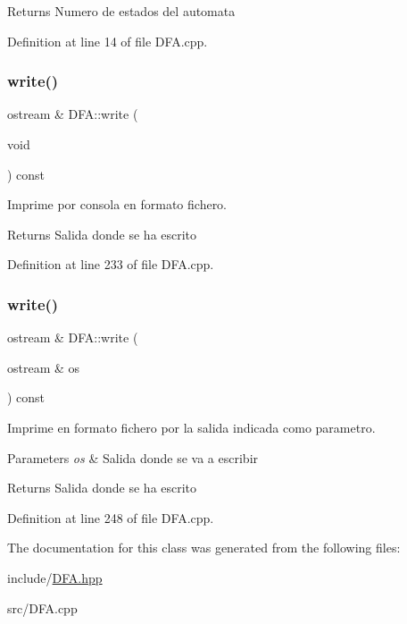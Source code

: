 \begin{DoxyReturn}{Returns}
Numero de estados del automata 
\end{DoxyReturn}


Definition at line 14 of file D\+F\+A.\+cpp.

\mbox{\label{class_d_f_a_a453bbd313adb90e3615694aad833b014}} 
\subsubsection{\texorpdfstring{write()}{write()}\hspace{0.1cm}{\footnotesize\ttfamily [1/2]}}
{\footnotesize\ttfamily ostream \& D\+F\+A\+::write (\begin{DoxyParamCaption}\item[{void}]{ }\end{DoxyParamCaption}) const}



Imprime por consola en formato fichero. 

\begin{DoxyReturn}{Returns}
Salida donde se ha escrito 
\end{DoxyReturn}


Definition at line 233 of file D\+F\+A.\+cpp.

\mbox{\label{class_d_f_a_aec27d0774ad67c7c29a5679e938fab5d}} 
\subsubsection{\texorpdfstring{write()}{write()}\hspace{0.1cm}{\footnotesize\ttfamily [2/2]}}
{\footnotesize\ttfamily ostream \& D\+F\+A\+::write (\begin{DoxyParamCaption}\item[{ostream \&}]{os }\end{DoxyParamCaption}) const}



Imprime en formato fichero por la salida indicada como parametro. 


\begin{DoxyParams}{Parameters}
{\em os} & Salida donde se va a escribir \\
\hline
\end{DoxyParams}
\begin{DoxyReturn}{Returns}
Salida donde se ha escrito 
\end{DoxyReturn}


Definition at line 248 of file D\+F\+A.\+cpp.



The documentation for this class was generated from the following files\+:\begin{DoxyCompactItemize}
\item 
include/\hyperlink{_d_f_a_8hpp}{D\+F\+A.\+hpp}\item 
src/D\+F\+A.\+cpp\end{DoxyCompactItemize}
